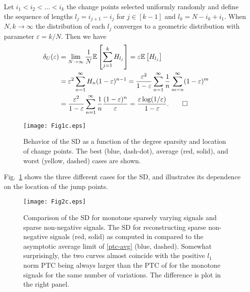 \documentclass[11pt]{article}
\begin{document}
\proof
	Let $i_1<i_2<\ldots<i_k$ the change points selected uniformly randomly and define the sequence of lengths $l_j = i_{j+1} - i_j$ for $j\in[k-1]$ and $l_k = N - i_k + i_1$. %
	When $N,k\rightarrow\infty$ the distribution of each $l_j$ converges to a geometric distribution with parameter $\varepsilon = k/N$.
	Then we have 
	\[ \begin{split}
		\delta_{U}(\varepsilon)  &= \lim_{N\rightarrow\infty}\dfrac{1}{N}\mathbb{E}\left[\sum_{j=1}^kH_{l_j}\right] = \varepsilon\mathbb{E}\left[H_{l_j}\right]\\
						  & = \varepsilon^2 \sum_{n=1}^{\infty}H_n(1-\varepsilon)^{n-1} 
						   = \dfrac{\varepsilon^2}{1-\varepsilon}  \sum_{n=1}^{\infty} \dfrac{1}{n}\sum_{m=n}^{\infty}(1-\varepsilon)^{m} \\
						  & = \dfrac{\varepsilon^2}{1-\varepsilon} \sum_{n=1}^{\infty} \dfrac{1}{n} \dfrac{(1-\varepsilon)^{n}}{\varepsilon} =  \dfrac{\varepsilon\log(1/\varepsilon)}{1-\varepsilon}.%
	\qed					 %
	\end{split} 
	\]  %

\begin{figure}
	\centering
	\texttt{[image: Fig1c.eps]}
	\caption{Behavior of the SD as a function of the degree sparsity and location of change points. The best (blue, dash-dot), average (red, solid), and worst (yellow, dashed) cases are shown.}
	\label{PTC-cases}
\end{figure}
\noindent Fig.~\ref{PTC-cases} shows the three different cases for the SD, and illustrates its dependence on the location of the jump points.
\begin{figure}
	\centering
	\texttt{[image: Fig2c.eps]}
	\caption{Comparison of the SD for monotone sparsely varying signals and sparse non-negative signals. The SD for reconstructing sparse non-negative signals (red, solid) as computed in \cite{DMM09} compared to the asymptotic average limit of \eqref{ptc-avg} (blue, dashed). Somewhat surprisingly, the two curves almost coincide with the positive $l_1$ norm PTC being always larger than the PTC of for the monotone signals for the same number of variations. The difference is plot in the right panel.}
	\label{PTC-plots}
\end{figure}
\end{document}
